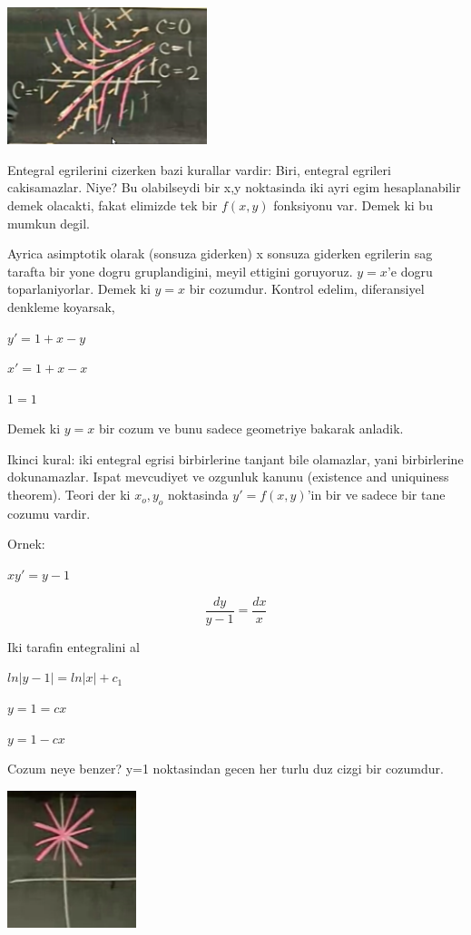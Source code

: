 \documentclass[12pt,fleqn]{article}\usepackage{../common}
\begin{document}
\includegraphics[height=4cm]{./1_4.png}

Entegral egrilerini cizerken bazi kurallar vardir: Biri, entegral egrileri
cakisamazlar. Niye? Bu olabilseydi bir x,y noktasinda iki ayri egim
hesaplanabilir demek olacakti, fakat elimizde tek bir $f(x,y)$ fonksiyonu
var. Demek ki bu mumkun degil.

Ayrica asimptotik olarak (sonsuza giderken) x sonsuza giderken egrilerin sag
tarafta bir yone dogru gruplandigini, meyil ettigini goruyoruz. $y=x$'e dogru
toparlaniyorlar. Demek ki $y=x$ bir cozumdur. Kontrol edelim, diferansiyel
denkleme koyarsak,

$y' = 1+x-y$

$x' = 1+x-x$

$1 = 1$

Demek ki $y=x$ bir cozum ve bunu sadece geometriye bakarak anladik. 

Ikinci kural: iki entegral egrisi birbirlerine tanjant bile olamazlar, yani
birbirlerine dokunamazlar. Ispat mevcudiyet ve ozgunluk kanunu (existence and
uniquiness theorem). Teori der ki $x_o, y_o$ noktasinda $y'=f(x,y)$'in bir ve
sadece bir tane cozumu vardir. 

Ornek: 

$xy' = y - 1 $

\[ \frac{dy}{y-1} = \frac{dx}{x} \]

Iki tarafin entegralini al

$ln|y-1| = ln|x| + c_1$

$y=1 = cx$

$y = 1-cx$


Cozum neye benzer? y=1 noktasindan gecen her turlu duz cizgi bir cozumdur. 

\includegraphics[height=4cm]{1_5.png}
\end{document}
